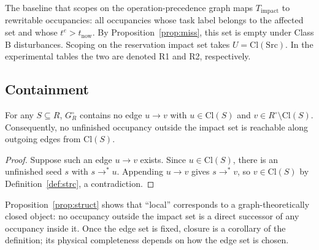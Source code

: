The baseline that scopes on the operation-precedence graph maps \(T_{\mathrm{impact}}\) to rewritable occupancies:
all occupancies whose task label belongs to the affected set and whose \(t^e>t_{\mathrm{now}}\).
By Proposition~\ref{prop:miss}, this set is empty under Class B disturbances.
Scoping on the reservation impact set takes \(U=\mathrm{Cl}(\mathrm{Src})\).
In the experimental tables the two are denoted R1 and R2, respectively.

\subsection{Containment}
\label{sec:containment}

\begin{prop}
\label{prop:struct}
For any \(S\subseteq R\), \(G_R^\circ\) contains no edge
\(u\to v\) with \(u\in\mathrm{Cl}(S)\) and \(v\in R^{\circ}\setminus\mathrm{Cl}(S)\).
Consequently, no unfinished occupancy outside the impact set is reachable along outgoing edges from \(\mathrm{Cl}(S)\).
\end{prop}

\begin{proof}
Suppose such an edge \(u\to v\) exists. Since \(u\in\mathrm{Cl}(S)\), there is an unfinished seed \(s\) with
\(s\to^* u\). Appending \(u\to v\) gives \(s\to^* v\), so \(v\in\mathrm{Cl}(S)\) by Definition~\ref{def:strc},
a contradiction.
\end{proof}

Proposition~\ref{prop:struct} shows that ``local'' corresponds to a graph-theoretically closed object: no occupancy outside the impact set is a direct successor of
any occupancy inside it. Once the edge set is fixed, closure is a corollary of the definition; its physical completeness depends on how the edge set is chosen.

